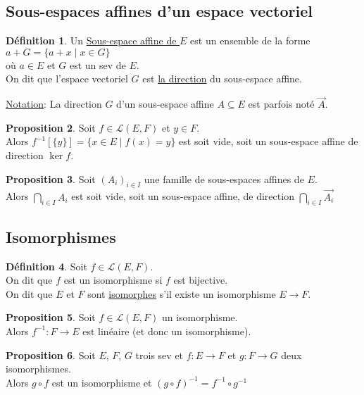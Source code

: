 \documentclass[10pt,a4paper]{article}
\theoremstyle{definition}
\newtheorem{proposition}{Proposition}[section]
\newtheorem{definition}[proposition]{Définition}
\begin{document}
\subsection{Sous-espaces affines d'un espace vectoriel}
\begin{definition}
Un \uline{Sous-espace affine de $E$} est un ensemble de la forme $a + G = \{ a + x \mid x \in G \}$ \\
où $a \in E$ et $G$ est un sev de $E$. \\
On dit que l'espace vectoriel $G$ est \uline{la direction} du sous-espace affine.
\end{definition}

\uline{Notation}: La direction $G$ d'un sous-espace affine $A \subseteq E$ est parfois noté $\vec{A}$.

\begin{proposition}
Soit $f \in \mathcal{L}(E, F)$ et $y \in F$. \\
Alors $f^{-1}[\{y\}] = \{ x \in E \mid f(x) = y \}$ est soit vide, soit un sous-espace affine de direction $\ker f$.
\end{proposition}
\begin{proposition}
Soit $(A_i)_{i \in I}$ une famille de sous-espaces affines de $E$. \\
Alors $\bigcap\limits_{i \in I} A_i$ est soit vide, soit un sous-espace affine, de direction $\bigcap\limits_{i \in I} \vec{A_i}$
\end{proposition}

\subsection{Isomorphismes}
\begin{definition}
Soit $f \in \mathcal{L}(E, F)$. \\
On dit que $f$ est un isomorphisme si $f$ est bijective. \\
On dit que $E$ et $F$ sont \uline{isomorphes} s'il existe un isomorphisme $E \to F$.
\end{definition}
\begin{proposition}
Soit $f \in \mathcal{L}(E, F)$ un isomorphisme. \\
Alors $f^{-1}: F \to E$ est linéaire (et donc un isomorphisme).
\end{proposition}
\begin{proposition}
Soit $E$, $F$, $G$ trois sev et $f: E \to F$ et $g: F \to G$ deux isomorphismes. \\
Alors $g \circ f$ est un isomorphisme et $(g \circ f)^{-1} = f^{-1} \circ g^{-1}$
\end{proposition}
\end{document}
